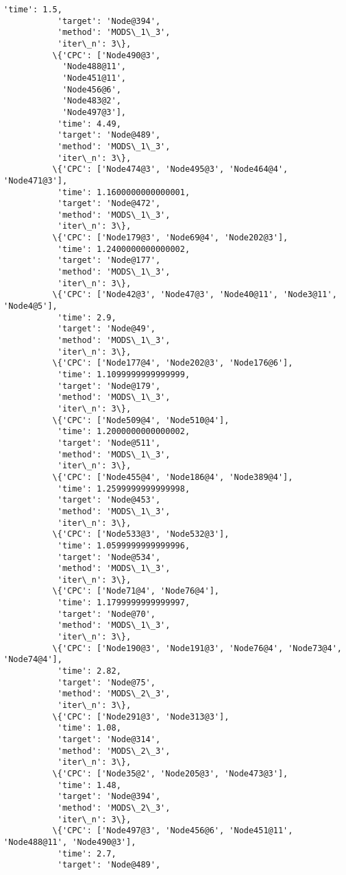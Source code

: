 \documentclass[11pt]{article}
\begin{document}
\begin{Verbatim}[commandchars=\\\{\}]
           'time': 1.5,
           'target': 'Node@394',
           'method': 'MODS\_1\_3',
           'iter\_n': 3\},
          \{'CPC': ['Node490@3',
            'Node488@11',
            'Node451@11',
            'Node456@6',
            'Node483@2',
            'Node497@3'],
           'time': 4.49,
           'target': 'Node@489',
           'method': 'MODS\_1\_3',
           'iter\_n': 3\},
          \{'CPC': ['Node474@3', 'Node495@3', 'Node464@4', 'Node471@3'],
           'time': 1.1600000000000001,
           'target': 'Node@472',
           'method': 'MODS\_1\_3',
           'iter\_n': 3\},
          \{'CPC': ['Node179@3', 'Node69@4', 'Node202@3'],
           'time': 1.2400000000000002,
           'target': 'Node@177',
           'method': 'MODS\_1\_3',
           'iter\_n': 3\},
          \{'CPC': ['Node42@3', 'Node47@3', 'Node40@11', 'Node3@11', 'Node4@5'],
           'time': 2.9,
           'target': 'Node@49',
           'method': 'MODS\_1\_3',
           'iter\_n': 3\},
          \{'CPC': ['Node177@4', 'Node202@3', 'Node176@6'],
           'time': 1.1099999999999999,
           'target': 'Node@179',
           'method': 'MODS\_1\_3',
           'iter\_n': 3\},
          \{'CPC': ['Node509@4', 'Node510@4'],
           'time': 1.2000000000000002,
           'target': 'Node@511',
           'method': 'MODS\_1\_3',
           'iter\_n': 3\},
          \{'CPC': ['Node455@4', 'Node186@4', 'Node389@4'],
           'time': 1.2599999999999998,
           'target': 'Node@453',
           'method': 'MODS\_1\_3',
           'iter\_n': 3\},
          \{'CPC': ['Node533@3', 'Node532@3'],
           'time': 1.0599999999999996,
           'target': 'Node@534',
           'method': 'MODS\_1\_3',
           'iter\_n': 3\},
          \{'CPC': ['Node71@4', 'Node76@4'],
           'time': 1.1799999999999997,
           'target': 'Node@70',
           'method': 'MODS\_1\_3',
           'iter\_n': 3\},
          \{'CPC': ['Node190@3', 'Node191@3', 'Node76@4', 'Node73@4', 'Node74@4'],
           'time': 2.82,
           'target': 'Node@75',
           'method': 'MODS\_2\_3',
           'iter\_n': 3\},
          \{'CPC': ['Node291@3', 'Node313@3'],
           'time': 1.08,
           'target': 'Node@314',
           'method': 'MODS\_2\_3',
           'iter\_n': 3\},
          \{'CPC': ['Node35@2', 'Node205@3', 'Node473@3'],
           'time': 1.48,
           'target': 'Node@394',
           'method': 'MODS\_2\_3',
           'iter\_n': 3\},
          \{'CPC': ['Node497@3', 'Node456@6', 'Node451@11', 'Node488@11', 'Node490@3'],
           'time': 2.7,
           'target': 'Node@489',

\end{Verbatim}
\end{document}

